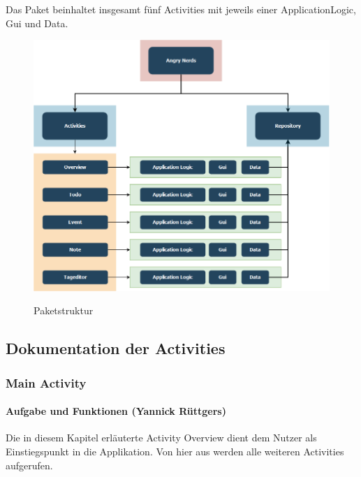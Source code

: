 Das Paket beinhaltet insgesamt fünf Activities mit jeweils einer ApplicationLogic, Gui und Data.

\begin{figure}[H]
\centering
\begin{minipage}[t]{1\textwidth} %
\caption{Paketstruktur} %
\includegraphics[width=1\textwidth]{img/Paketstruktur}\\ %
\end{minipage}
\end{figure}

\newpage
\subsection{Dokumentation der Activities}

\subsubsection{Main Activity}

\paragraph{Aufgabe und Funktionen (Yannick Rüttgers)}
Die in diesem Kapitel erläuterte Activity Overview dient dem Nutzer als Einstiegspunkt in die Applikation. Von hier aus werden alle weiteren Activities aufgerufen.

